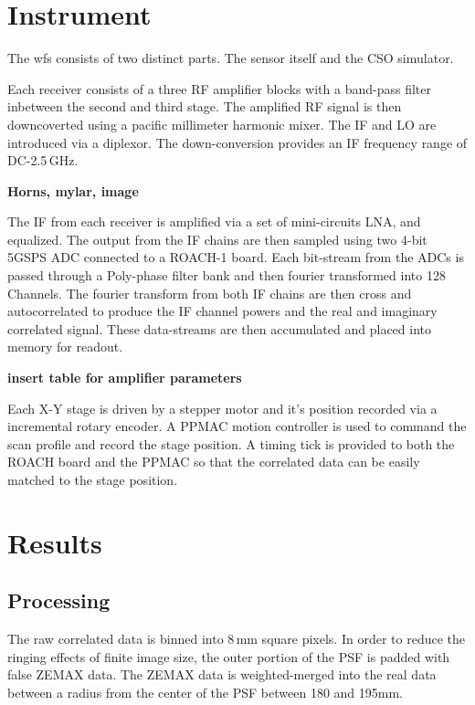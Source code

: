 \documentclass[osajnl,twocolumn,showpacs,superscriptaddress,11pt]{revtex4-1} %
\begin{document}
\section{Instrument}

The wfs consists of two distinct parts. The sensor itself and the CSO simulator.

Each receiver consists of a three RF amplifier blocks with a band-pass filter inbetween the second and third stage. The amplified RF signal is then downcoverted using a pacific millimeter harmonic mixer. The IF and LO are introduced via a diplexor.  The down-conversion provides an IF frequency range of DC-2.5\,GHz.

{\bf Horns, mylar, image}

The IF from each receiver is amplified via a set of mini-circuits LNA, and equalized.  The output from the IF chains are then sampled using two 4-bit 5GSPS ADC connected to a ROACH-1 board.  Each bit-stream from the ADCs is passed through a Poly-phase filter bank and then fourier transformed into 128 Channels.  The fourier transform from both IF chains are then cross and autocorrelated to produce the IF channel powers and the real and imaginary correlated signal.    These data-streams are then accumulated and placed into memory for readout.  

{\bf insert table for amplifier parameters}

Each X-Y stage is driven by a stepper motor and it's position recorded via a incremental rotary encoder.  A PPMAC motion controller is used to command the scan profile and record the stage position.  A timing tick is provided to both the ROACH board and the PPMAC so that the correlated data can be easily matched to the stage position.

\section{Results}

\subsection{Processing}

The raw correlated data is binned into 8\,mm square pixels. In order to reduce the ringing effects of finite image size, the outer portion of the PSF is padded with false ZEMAX data.  The ZEMAX data is weighted-merged into the real data between a radius from the center of the PSF between 180 and 195mm.
\end{document}
